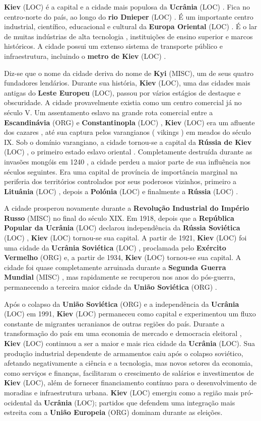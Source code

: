 \documentclass[12pt,a4paper]{article}
\begin{document}
\textbf{Kiev} (LOC) é a capital e a cidade mais populosa da \textbf{Ucrânia} (LOC) . Fica no centro-norte do país, ao longo do \textbf{rio Dnieper} (LOC) . É um importante centro industrial, científico, educacional e cultural da \textbf{Europa Oriental} (LOC) . É o lar de muitas indústrias de alta tecnologia , instituições de ensino superior e marcos históricos. A cidade possui um extenso sistema de transporte público e infraestrutura, incluindo o \textbf{metro de Kiev} (LOC) .

Diz-se que o nome da cidade deriva do nome de \textbf{Kyi} (MISC), um de seus quatro fundadores lendários. Durante sua história, \textbf{Kiev} (LOC), uma das cidades mais antigas do \textbf{Leste Europeu} (LOC), passou por vários estágios de destaque e obscuridade. A cidade provavelmente existia como um centro comercial já no século V. Um assentamento eslavo na grande rota comercial entre a \textbf{Escandinávia} (ORG) e \textbf{Constantinopla} (LOC) , \textbf{Kiev} (LOC) era um afluente dos cazares , até sua captura pelos varangianos ( vikings ) em meados do século IX. Sob o domínio varangiano, a cidade tornou-se a capital da \textbf{Rússia de Kiev} (LOC) , o primeiro estado eslavo oriental . Completamente destruída durante as invasões mongóis em 1240 , a cidade perdeu a maior parte de sua influência nos séculos seguintes. Era uma capital de província de importância marginal na periferia dos territórios controlados por seus poderosos vizinhos, primeiro a \textbf{Lituânia} (LOC) , depois a \textbf{Polónia} (LOC) e finalmente a \textbf{Rússia} (LOC) .

A cidade prosperou novamente durante a \textbf{Revolução Industrial do Império Russo} (MISC) no final do século XIX. Em 1918, depois que a \textbf{República Popular da Ucrânia} (LOC) declarou independência da \textbf{Rússia Soviética} (LOC) , \textbf{Kiev} (LOC) tornou-se sua capital. A partir de 1921, \textbf{Kiev} (LOC) foi uma cidade da \textbf{Ucrânia Soviética} (LOC) , proclamada pelo \textbf{Exército Vermelho} (ORG) e, a partir de 1934, \textbf{Kiev} (LOC) tornou-se sua capital. A cidade foi quase completamente arruinada durante a \textbf{Segunda Guerra Mundial} (MISC) , mas rapidamente se recuperou nos anos do pós-guerra, permanecendo a terceira maior cidade da \textbf{União Soviética} (ORG) .

Após o colapso da \textbf{União Soviética} (ORG) e a independência da \textbf{Ucrânia} (LOC) em 1991, \textbf{Kiev} (LOC) permaneceu como capital e experimentou um fluxo constante de migrantes ucranianos de outras regiões do país. Durante a transformação do país em uma economia de mercado e democracia eleitoral , \textbf{Kiev} (LOC) continuou a ser a maior e mais rica cidade da \textbf{Ucrânia} (LOC). Sua produção industrial dependente de armamentos caiu após o colapso soviético, afetando negativamente a ciência e a tecnologia, mas novos setores da economia, como serviços e finanças, facilitaram o crescimento de salários e investimentos de \textbf{Kiev} (LOC), além de fornecer financiamento contínuo para o desenvolvimento de moradias e infraestrutura urbana. \textbf{Kiev} (LOC) emergiu como a região mais pró- ocidental da \textbf{Ucrânia} (LOC); partidos que defendem uma integração mais estreita com a \textbf{União Europeia} (ORG) dominam durante as eleições.
\end{document}
